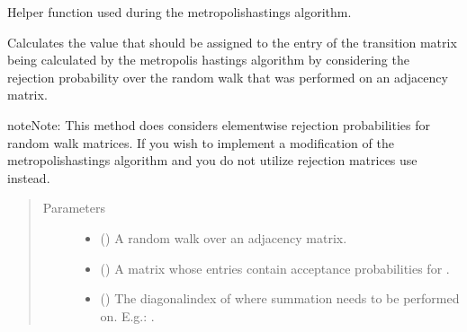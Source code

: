 \documentclass[letterpaper,10pt,english]{sphinxmanual}
\begin{document}
\begin{fulllineitems}
\label{\detokenize{app.domain.helpers:app.domain.helpers.matrices._get_diagonal_entry_probability_v1}}
Helper function used during the metropolis\sphinxhyphen{}hastings algorithm.

Calculates the value that should be assigned to the entry  of the
transition matrix being calculated by the metropolis hastings algorithm
by considering the rejection probability over the random walk that was
performed on an adjacency matrix.

\begin{sphinxadmonition}{note}{Note:}
This method does considers element\sphinxhyphen{}wise rejection probabilities
for random walk matrices. If you wish to implement a modification of
the metropolis\sphinxhyphen{}hastings algorithm and you do not utilize rejection
matrices use {\hyperref[\detokenize{app.domain.helpers:app.domain.helpers.matrices._get_diagonal_entry_probability_v2}]{}} instead.
\end{sphinxadmonition}
\begin{quote}\begin{description}
\item[{Parameters}] \leavevmode\begin{itemize}
\item {} 
 () \textendash{} A random walk over an adjacency matrix.

\item {} 
 () \textendash{} A matrix whose entries contain acceptance probabilities for .

\item {} 
 () \textendash{} The diagonal\sphinxhyphen{}index of  where summation needs to
be performed on. E.g.: .


\end{itemize}
\end{description}
\end{quote}
\end{fulllineitems}
\end{document}
